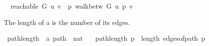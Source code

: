\begin{isabellebody}
\ \ {\isachardoublequoteopen}reachable\ G\ u\ v\ {\isasymequiv}\ {\isasymexists}p{\isachardot}{\kern0pt}\ walk{\isacharunderscore}{\kern0pt}betw\ G\ u\ p\ v{\isachardoublequoteclose}%
\begin{isamarkuptext}%
The length of a  is the number of its edges.%
\end{isamarkuptext}\isamarkuptrue%
\isamarkupfalse%
\ path{\isacharunderscore}{\kern0pt}length\ {\isacharcolon}{\kern0pt}{\isacharcolon}{\kern0pt}\ {\isachardoublequoteopen}{\isacharprime}{\kern0pt}a\ path\ {\isasymRightarrow}\ nat{\isachardoublequoteclose}\ \isanewline
\ \ {\isachardoublequoteopen}path{\isacharunderscore}{\kern0pt}length\ p\ {\isasymequiv}\ length\ {\isacharparenleft}{\kern0pt}edges{\isacharunderscore}{\kern0pt}of{\isacharunderscore}{\kern0pt}path\ p{\isacharparenright}{\kern0pt}{\isachardoublequoteclose}\isanewline
%
\isadelimtheory
\isanewline
%
\endisadelimtheory
%
\isatagtheory
{}\isamarkupfalse%
%
\endisatagtheory
{\isafoldtheory}%
%
\isadelimtheory
%
\endisadelimtheory
%
\end{isabellebody}%
\endinput
